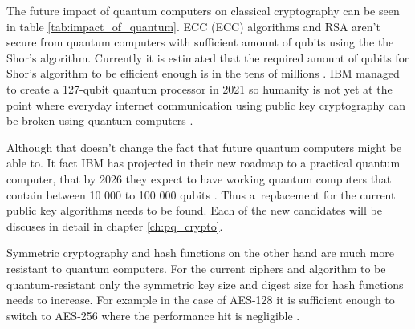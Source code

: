 The future impact of quantum computers on classical cryptography can be seen in table \ref{tab:impact_of_quantum}. ECC (\acl{ECC}) algorithms and RSA aren't secure from quantum computers with sufficient amount of qubits using the the Shor's algorithm. Currently it is estimated that the required amount of qubits for Shor's algorithm to be efficient enough is in the tens of millions \cite{Bernstein149}\cite{Mosca2015}. IBM managed to create a 127-qubit quantum processor in 2021 so humanity is not yet at the point where everyday internet communication using public key cryptography can be broken using quantum computers \cite{0MBNdFRCTLK35MFY}. 

Although that doesn't change the fact that future quantum computers might be able to. It fact IBM has projected in their new roadmap to a practical quantum computer, that by 2026 they expect to have working quantum computers that contain between 10 000 to 100 000 qubits \cite{Gambetta2021}. Thus a~replacement for the current public key algorithms needs to be found. Each of the new candidates will be discuses in detail in chapter \ref{ch:pq_crypto}.

Symmetric cryptography and hash functions on the other hand are much more resistant to quantum computers. For the current ciphers and algorithm to be quantum-resistant only the symmetric key size and digest size for hash functions needs to increase. For example in the case of AES-128 it is sufficient enough to switch to AES-256 where the performance hit is negligible \cite{Bernstein149}.

